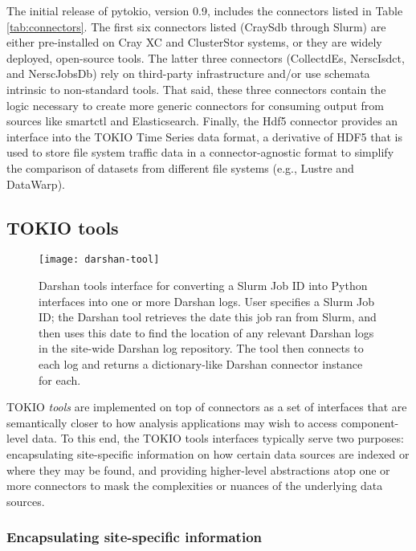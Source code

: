 The initial release of pytokio, version 0.9, includes the connectors listed in Table \ref{tab:connectors}.
The first six connectors listed (CraySdb through Slurm) are either pre-installed on Cray XC and ClusterStor systems, or they are widely deployed, open-source tools.
The latter three connectors (CollectdEs, NerscIsdct, and NerscJobsDb) rely on third-party infrastructure and/or use schemata intrinsic to non-standard tools.
That said, these three connectors contain the logic necessary to create more generic connectors for consuming output from sources like smartctl and Elasticsearch.
Finally, the Hdf5 connector provides an interface into the TOKIO Time Series data format, a derivative of HDF5 that is used to store file system traffic data in a connector-agnostic format to simplify the comparison of datasets from different file systems (e.g., Lustre and DataWarp).

\subsection{TOKIO tools} \label{sec:architecture/tools}

\begin{figure}[b]
    \centering
    \texttt{[image: darshan-tool]}
    \caption{Darshan tools interface for converting a Slurm Job ID into Python interfaces into one or more Darshan logs.
    User specifies a Slurm Job ID; the Darshan tool retrieves the date this job ran from Slurm, and then uses this date to find the location of any relevant Darshan logs in the site-wide Darshan log repository.
    The tool then connects to each log and returns a dictionary-like Darshan connector instance for each.}
    \label{fig:darshan-tool}
    \vspace{-.2in}
\end{figure}

TOKIO \emph{tools} are implemented on top of connectors as a set of interfaces that are semantically closer to how analysis applications may wish to access component-level data.
To this end, the TOKIO tools interfaces typically serve two purposes:
encapsulating site-specific information on how certain data sources are indexed or where they may be found, and
providing higher-level abstractions atop one or more connectors to mask the complexities or nuances of the underlying data sources.

\subsubsection{Encapsulating site-specific information}

